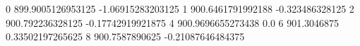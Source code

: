 0 899.9005126953125 -1.06915283203125
1 900.6461791992188 -0.323486328125
2 900.792236328125 -0.17742919921875
4 900.9696655273438 0.0
6 901.3046875 0.33502197265625
8 900.7587890625 -0.21087646484375
